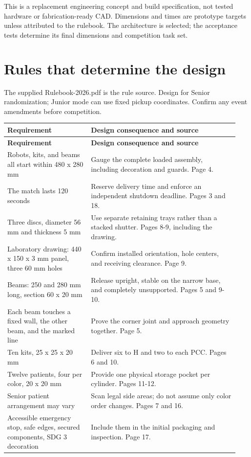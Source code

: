 \documentclass[10pt,a4paper]{article}
\begin{document}
This is a replacement engineering concept and build specification, not tested hardware or fabrication-ready CAD. Dimensions and times are prototype targets unless attributed to the rulebook. The architecture is selected; the acceptance tests determine its final dimensions and competition task set.

\section{Rules that determine the design}
The supplied Rulebook-2026.pdf is the rule source. Design for Senior randomization; Junior mode can use fixed pickup coordinates. Confirm any event amendments before competition.

\small\begin{longtable}{@{}>{\raggedright\arraybackslash}p{0.34\linewidth}>{\raggedright\arraybackslash}p{0.6\linewidth}@{}}
\toprule
\textbf{Requirement} & \textbf{Design consequence and source} \\
\midrule\endfirsthead
\toprule\textbf{Requirement} & \textbf{Design consequence and source} \\\midrule\endhead
Robots, kits, and beams all start within 480 x 280 mm & Gauge the complete loaded assembly, including decoration and guards. Page 4. \\[3pt]
The match lasts 120 seconds & Reserve delivery time and enforce an independent shutdown deadline. Pages 3 and 18. \\[3pt]
Three discs, diameter 56 mm and thickness 5 mm & Use separate retaining trays rather than a stacked shutter. Pages 8-9, including the drawing. \\[3pt]
Laboratory drawing: 440 x 150 x 3 mm panel, three 60 mm holes & Confirm installed orientation, hole centers, and receiving clearance. Page 9. \\[3pt]
Beams: 250 and 280 mm long, section 60 x 20 mm & Release upright, stable on the narrow base, and completely unsupported. Pages 5 and 9-10. \\[3pt]
Each beam touches a fixed wall, the other beam, and the marked line & Prove the corner joint and approach geometry together. Page 5. \\[3pt]
Ten kits, 25 x 25 x 20 mm & Deliver six to H and two to each PCC. Pages 6 and 10. \\[3pt]
Twelve patients, four per color, 20 x 20 mm & Provide one physical storage pocket per cylinder. Pages 11-12. \\[3pt]
Senior patient arrangement may vary & Scan legal side areas; do not assume only color order changes. Pages 7 and 16. \\[3pt]
Accessible emergency stop, safe edges, secured components, SDG 3 decoration & Include them in the initial packaging and inspection. Page 17. \\[3pt]
\bottomrule\end{longtable}\normalsize
\end{document}
